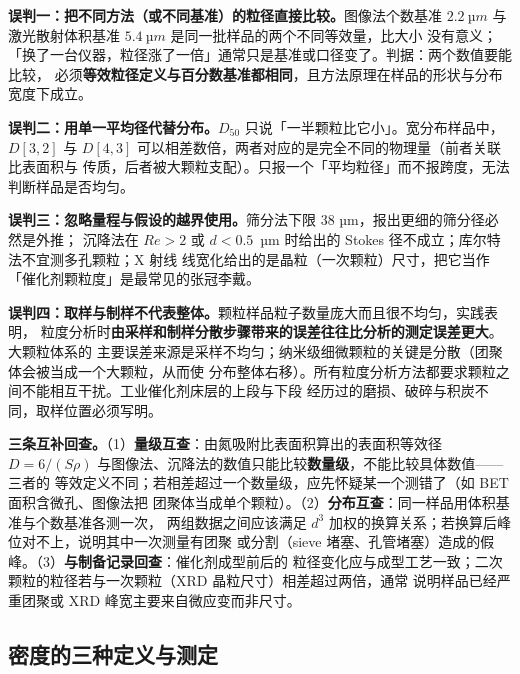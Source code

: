 \begin{pitfall}
\textbf{误判一：把不同方法（或不同基准）的粒径直接比较。}图像法个数基准
$\qty{2.2}{µm}$ 与激光散射体积基准 $\qty{5.4}{µm}$ 是同一批样品的两个不同等效量，比大小
没有意义；「换了一台仪器，粒径涨了一倍」通常只是基准或口径变了。判据：两个数值要能比较，
必须\textbf{等效粒径定义与百分数基准都相同}，且方法原理在样品的形状与分布宽度下成立。

\textbf{误判二：用单一平均径代替分布。}$D_{50}$ 只说「一半颗粒比它小」。宽分布样品中，
$D[3,2]$ 与 $D[4,3]$ 可以相差数倍，两者对应的是完全不同的物理量（前者关联比表面积与
传质，后者被大颗粒支配）。只报一个「平均粒径」而不报跨度，无法判断样品是否均匀。

\textbf{误判三：忽略量程与假设的越界使用。}筛分法下限 38 µm，报出更细的筛分径必然是外推；
沉降法在 $Re>2$ 或 $d<0.5$~µm 时给出的 Stokes 径不成立；库尔特法不宜测多孔颗粒；X 射线
线宽化给出的是晶粒（一次颗粒）尺寸，把它当作「催化剂颗粒度」是最常见的张冠李戴。

\textbf{误判四：取样与制样不代表整体。}颗粒样品粒子数量庞大而且很不均匀，实践表明，
粒度分析时\textbf{由采样和制样分散步骤带来的误差往往比分析的测定误差更大}。大颗粒体系的
主要误差来源是采样不均匀；纳米级细微颗粒的关键是分散（团聚体会被当成一个大颗粒，从而使
分布整体右移）。所有粒度分析方法都要求颗粒之间不能相互干扰。工业催化剂床层的上段与下段
经历过的磨损、破碎与积炭不同，取样位置必须写明。
\end{pitfall}

\begin{crosscheck}
\textbf{三条互补回查。}（1）\textbf{量级互查}：由氮吸附比表面积算出的表面积等效径
$D=6/(S\rho)$ 与图像法、沉降法的数值只能比较\textbf{数量级}，不能比较具体数值——三者的
等效定义不同；若相差超过一个数量级，应先怀疑某一个测错了（如 BET 面积含微孔、图像法把
团聚体当成单个颗粒）。（2）\textbf{分布互查}：同一样品用体积基准与个数基准各测一次，
两组数据之间应该满足 $d^{3}$ 加权的换算关系；若换算后峰位对不上，说明其中一次测量有团聚
或分割（sieve 堵塞、孔管堵塞）造成的假峰。（3）\textbf{与制备记录回查}：催化剂成型前后的
粒径变化应与成型工艺一致；二次颗粒的粒径若与一次颗粒（XRD 晶粒尺寸）相差超过两倍，通常
说明样品已经严重团聚或 XRD 峰宽主要来自微应变而非尺寸。
\end{crosscheck}

\subsection{密度的三种定义与测定}

